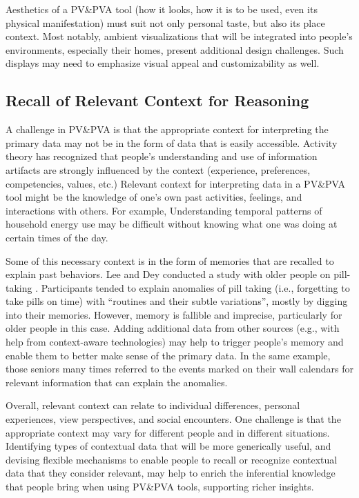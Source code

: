 \documentclass[12pt,oneside]{book}
\begin{document}
Aesthetics of a PV\&PVA tool (how it looks, how it is to be used, even its physical manifestation) must suit not only personal taste, but also its place context.  Most notably, ambient visualizations that will be integrated into people's environments, especially their homes, present additional design challenges.  Such displays may need to emphasize visual appeal and customizability as well.

\subsection{Recall of Relevant Context for Reasoning}
\label{pva:context}
A challenge in PV\&PVA is that the appropriate context for interpreting the primary data may not be in the form of data that is easily accessible.  Activity theory \cite{allen_working_2011} has recognized that people's understanding and use of information artifacts are strongly influenced by the context (experience, preferences, competencies, values, etc.)  Relevant context for interpreting data in a PV\&PVA tool might be the knowledge of one's own past activities, feelings, and interactions with others. For example, Understanding temporal patterns of household energy use may be difficult without knowing what one was doing at certain times of the day. 

Some of this necessary context is in the form of memories that are recalled to explain past behaviors.  Lee and Dey conducted a study with older people on pill-taking \cite{lee_reflecting_2011}.  Participants tended to explain anomalies of pill taking (i.e., forgetting to take pills on time) with ``routines and their subtle variations'', mostly by digging into their memories.  However, memory is fallible and imprecise, particularly for older people in this case.  Adding additional data from other sources (e.g., with help from context-aware technologies) may help to trigger people's memory and enable them to better make sense of the primary data.  In the same example, those seniors many times referred to the events marked on their wall calendars for relevant information that can explain the anomalies.

Overall, relevant context can relate to individual differences, personal experiences, view perspectives, and social encounters.  One challenge is that the appropriate context may vary for different people and in different situations.  Identifying types of contextual data that will be more generically useful, and devising flexible mechanisms to enable people to recall or recognize contextual data that they consider relevant, may help to enrich the inferential knowledge that people bring when using PV\&PVA tools, supporting richer insights.
\end{document}
